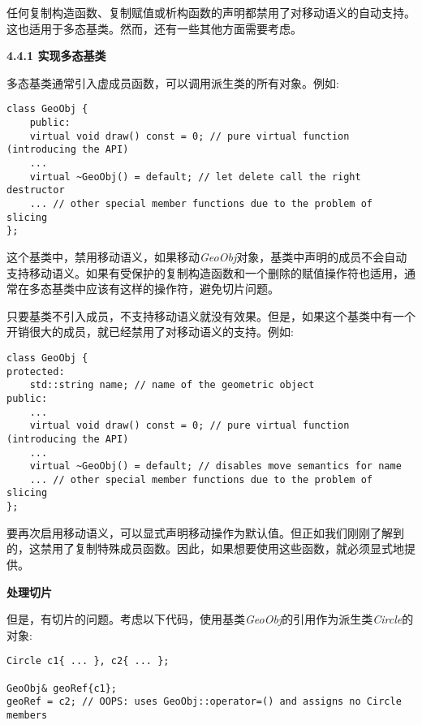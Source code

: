 任何复制构造函数、复制赋值或析构函数的声明都禁用了对移动语义的自动支持。这也适用于多态基类。然而，还有一些其他方面需要考虑。\par

\hspace*{\fill} \par %
\textbf{4.4.1 实现多态基类}

多态基类通常引入虚成员函数，可以调用派生类的所有对象。例如:\par

\begin{lstlisting}[caption={}]
class GeoObj {
	public:
	virtual void draw() const = 0; // pure virtual function (introducing the API)
	...
	virtual ~GeoObj() = default; // let delete call the right destructor
	... // other special member functions due to the problem of slicing
};
\end{lstlisting}

这个基类中，禁用移动语义，如果移动\textit{GeoObj}对象，基类中声明的成员不会自动支持移动语义。如果有受保护的复制构造函数和一个删除的赋值操作符也适用，通常在多态基类中应该有这样的操作符，避免切片问题。\par

只要基类不引入成员，不支持移动语义就没有效果。但是，如果这个基类中有一个开销很大的成员，就已经禁用了对移动语义的支持。例如:\par

\begin{lstlisting}[caption={}]
class GeoObj {
protected:
	std::string name; // name of the geometric object
public:
	...
	virtual void draw() const = 0; // pure virtual function (introducing the API)
	...
	virtual ~GeoObj() = default; // disables move semantics for name
	... // other special member functions due to the problem of slicing
};
\end{lstlisting}

要再次启用移动语义，可以显式声明移动操作为默认值。但正如我们刚刚了解到的，这禁用了复制特殊成员函数。因此，如果想要使用这些函数，就必须显式地提供。\par

\hspace*{\fill} \par %
\textbf{处理切片}

但是，有切片的问题。考虑以下代码，使用基类\textit{GeoObj}的引用作为派生类\textit{Circle}的对象:\par

\begin{lstlisting}[caption={}]
Circle c1{ ... }, c2{ ... };

GeoObj& geoRef{c1};
geoRef = c2; // OOPS: uses GeoObj::operator=() and assigns no Circle members
\end{lstlisting}

